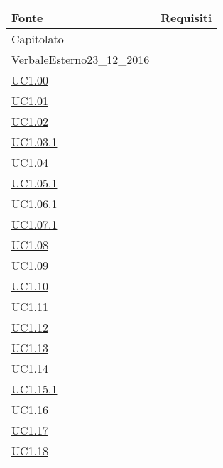 \begin{longtable}{|P{6cm}|P{6cm}|}
	\hline \textbf{Fonte} & \textbf{Requisiti}\\
	\hline Capitolato &  \linebreak {} \linebreak {} \linebreak {} \linebreak {} \\
	\hline VerbaleEsterno23\_12\_2016 &  \linebreak {} \\
	\hline \hyperref[UC1.00]{UC1.00} &  \\
	\hline \hyperref[UC1.01]{UC1.01} &  \\
	\hline \hyperref[UC1.02]{UC1.02} &  \\
	\hline \hyperref[UC1.03.1]{UC1.03.1} &  \\
	\hline \hyperref[UC1.04]{UC1.04} &  \\
	\hline \hyperref[UC1.05.1]{UC1.05.1} &  \\
	\hline \hyperref[UC1.06.1]{UC1.06.1} &  \\
	\hline \hyperref[UC1.07.1]{UC1.07.1} &  \\
	\hline \hyperref[UC1.08]{UC1.08} &  \\
	\hline \hyperref[UC1.09]{UC1.09} &  \\
	\hline \hyperref[UC1.10]{UC1.10} &  \\
	\hline \hyperref[UC1.11]{UC1.11} &  \\	
	\hline \hyperref[UC1.12]{UC1.12} &  \\
	\hline \hyperref[UC1.13]{UC1.13} &  \\	
	\hline \hyperref[UC1.14]{UC1.14} &  \\
	\hline \hyperref[UC1.15.1]{UC1.15.1} &  \\
	\hline \hyperref[UC1.16]{UC1.16} &  \\
	\hline \hyperref[UC1.17]{UC1.17} &  \\
	\hline \hyperref[UC1.18]{UC1.18} &  \\

\end{longtable}

